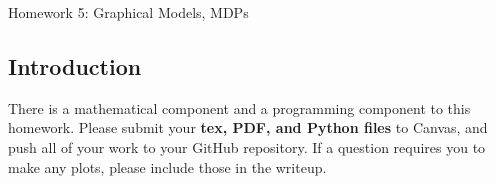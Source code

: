 \documentclass[submit]{harvardml}
\begin{document}
\begin{center}
{\Large Homework 5: Graphical Models, MDPs}\\
\end{center}

\subsection*{Introduction}


There is a mathematical component and a programming component to this
homework.  Please submit your \textbf{tex, PDF, and Python files} to
Canvas, and push all of your work to your GitHub repository. If a
question requires you to make any plots, please include those in the
writeup.

\newpage
\end{document}
